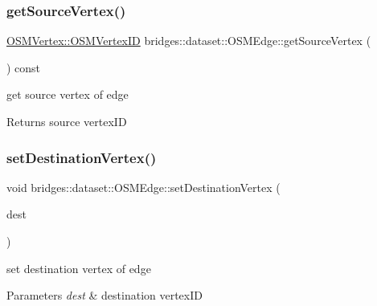 \subsubsection{\texorpdfstring{getSourceVertex()}{getSourceVertex()}}
{\footnotesize\ttfamily \mbox{\hyperlink{classbridges_1_1dataset_1_1_o_s_m_vertex_ad166f13b0aefbdc05a273546f2a3bb96}{O\+S\+M\+Vertex\+::\+O\+S\+M\+Vertex\+ID}} bridges\+::dataset\+::\+O\+S\+M\+Edge\+::get\+Source\+Vertex (\begin{DoxyParamCaption}{ }\end{DoxyParamCaption}) const\hspace{0.3cm}{\ttfamily [inline]}}

get source vertex of edge

\begin{DoxyReturn}{Returns}
source vertex\+ID 
\end{DoxyReturn}
\mbox{\label{classbridges_1_1dataset_1_1_o_s_m_edge_a71868ae7357fc2aaa576e6befbbb0112}} 
\subsubsection{\texorpdfstring{setDestinationVertex()}{setDestinationVertex()}}
{\footnotesize\ttfamily void bridges\+::dataset\+::\+O\+S\+M\+Edge\+::set\+Destination\+Vertex (\begin{DoxyParamCaption}\item[{\mbox{\hyperlink{classbridges_1_1dataset_1_1_o_s_m_vertex_ad166f13b0aefbdc05a273546f2a3bb96}{O\+S\+M\+Vertex\+::\+O\+S\+M\+Vertex\+ID}}}]{dest }\end{DoxyParamCaption})\hspace{0.3cm}{\ttfamily [inline]}}

set destination vertex of edge


\begin{DoxyParams}{Parameters}
{\em dest} & destination vertex\+ID \\
\hline
\end{DoxyParams}
\mbox{\label{classbridges_1_1dataset_1_1_o_s_m_edge_a469d98f2239f245b43d3475cbc8c0e74}} 
